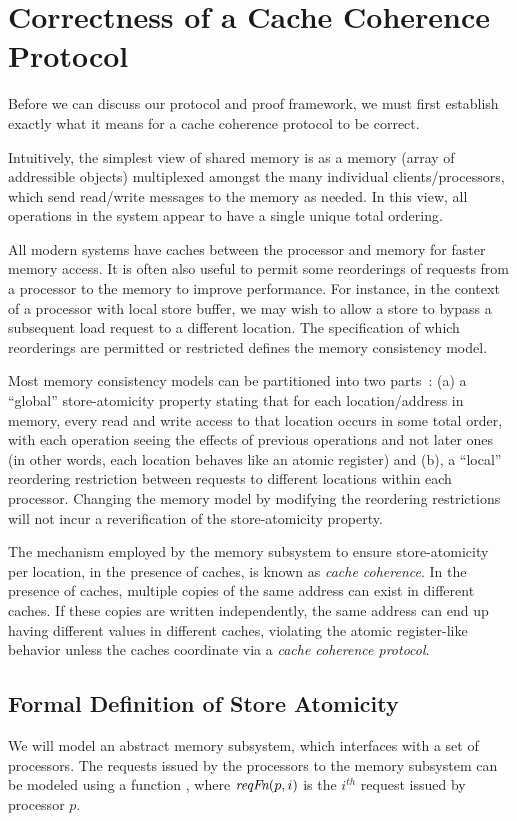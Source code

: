 \section{Correctness of a Cache Coherence Protocol}
\label{Sec:Background}

Before we can discuss our protocol and proof framework, we must first establish
exactly what it means for a cache coherence protocol to be correct. 

Intuitively, the simplest view of shared memory is as a memory (array of addressible objects)
multiplexed amongst the many individual clients/processors, which send read/write
messages to the memory as needed. In
this view, all operations in the system appear to have a single unique total
ordering.

All modern systems have caches between the processor and memory for faster
memory access.  It is often also useful to permit some reorderings of requests
from a processor to the memory to improve performance.  For instance, in the
context of a processor with local store buffer, we may wish to allow a store to
bypass a subsequent load request to a different location. The specification of
which reorderings are permitted or restricted defines the memory consistency
model.

Most memory consistency models can be partitioned into two
parts~\cite{Arvind-memory-model}: (a) a ``global'' store-atomicity property
stating that for each location/address in memory, every read and write access
to that location occurs in some total order, with each operation seeing the
effects of previous operations and not later ones (in other words, each
location behaves like an atomic register) and (b), a ``local'' reordering
restriction between requests to different locations within each processor.
Changing the memory model by modifying the reordering restrictions will not
incur a reverification of the store-atomicity property.

The mechanism employed by the memory subsystem to ensure store-atomicity per
location, in the presence of caches, is known as \emph{cache coherence}. In the
presence of caches, multiple copies of the same address can exist in different
caches. If these copies are written independently, the same address can end up
having different values in different caches, violating the atomic register-like
behavior unless the caches coordinate via a \emph{cache coherence protocol}.

\subsection{Formal Definition of Store Atomicity}
We will model an abstract memory subsystem, which interfaces with a set of
processors. The requests issued by the processors to the memory subsystem can
be modeled using a function \reqFn, where $\textit{reqFn}(p, i)$ is the $i^{th}$ request
issued by processor $p$.

